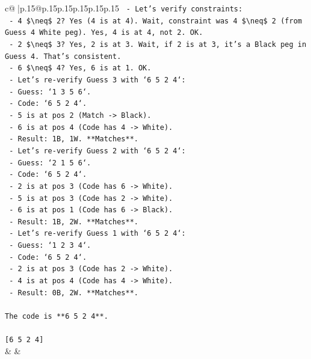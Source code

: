\documentclass{article}
\begin{document}
{\begin{supertabular}{c@{$\;$}|p{.15\linewidth}@{}p{.15\linewidth}p{.15\linewidth}p{.15\linewidth}p{.15\linewidth}p{.15\linewidth}}
{{{\texttt{    {-} Let's verify constraints:} \\
\texttt{        {-} 4 \$\textbackslash{}neq\$ 2? Yes (4 is at 4). Wait, constraint was 4 \$\textbackslash{}neq\$ 2 (from Guess 4 White peg). Yes, 4 is at 4, not 2. OK.} \\
\texttt{        {-} 2 \$\textbackslash{}neq\$ 3? Yes, 2 is at 3. Wait, if 2 is at 3, it's a Black peg in Guess 4. That's consistent.} \\
\texttt{        {-} 6 \$\textbackslash{}neq\$ 4? Yes, 6 is at 1. OK.} \\
\texttt{    {-} Let's re{-}verify Guess 3 with `6 5 2 4`:} \\
\texttt{        {-} Guess: `1 3 5 6`.} \\
\texttt{        {-} Code: `6 5 2 4`.} \\
\texttt{        {-} 5 is at pos 2 (Match {-}> Black).} \\
\texttt{        {-} 6 is at pos 4 (Code has 4 {-}> White).} \\
\texttt{        {-} Result: 1B, 1W. **Matches**.} \\
\texttt{    {-} Let's re{-}verify Guess 2 with `6 5 2 4`:} \\
\texttt{        {-} Guess: `2 1 5 6`.} \\
\texttt{        {-} Code: `6 5 2 4`.} \\
\texttt{        {-} 2 is at pos 3 (Code has 6 {-}> White).} \\
\texttt{        {-} 5 is at pos 3 (Code has 2 {-}> White).} \\
\texttt{        {-} 6 is at pos 1 (Code has 6 {-}> Black).} \\
\texttt{        {-} Result: 1B, 2W. **Matches**.} \\
\texttt{    {-} Let's re{-}verify Guess 1 with `6 5 2 4`:} \\
\texttt{        {-} Guess: `1 2 3 4`.} \\
\texttt{        {-} Code: `6 5 2 4`.} \\
\texttt{        {-} 2 is at pos 3 (Code has 2 {-}> White).} \\
\texttt{        {-} 4 is at pos 4 (Code has 4 {-}> White).} \\
\texttt{        {-} Result: 0B, 2W. **Matches**.} \\
\\ 
\texttt{The code is **6 5 2 4**.} \\
\\ 
\texttt{{[}6 5 2 4{]}} \\
            }
        }
    }
    & & \\ \\


\end{supertabular}}
\end{document}
